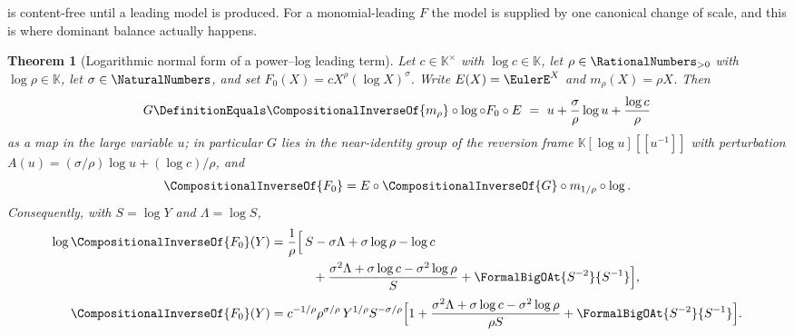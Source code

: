 \documentclass[11pt,oneside]{article}
\theoremstyle{plain}
\newtheorem{theorem}{Theorem}[section]
\theoremstyle{definition}
\theoremstyle{remark}
\newcommand{\K}{\mathbb{K}}
\newcommand{\compose}{\mathbin{\circ}}
\newcommand{\rev}[1]{\CompositionalInverseOf{#1}}
\begin{document}
 is content-free until a leading model is produced.
For a monomial-leading \(F\) the model is supplied by one canonical change of
scale, and this is where dominant balance actually happens.

\begin{theorem}[Logarithmic normal form of a power--log leading term]
\label{plt:thm:lag-log-normal-form}
Let \(c\in\K^\times\) with \(\log c\in\K\), let \(\rho\in\RationalNumbers_{>0}\)
with \(\log\rho\in\K\), let \(\sigma\in\NaturalNumbers\), and set
\(F_0(X)=cX^{\rho}(\log X)^{\sigma}\).  Write \(E(X)=\EulerE^{X}\) and
\(m_\rho(X)=\rho X\).  Then
\begin{equation}
\label{plt:eq:lag-log-conjugate}
  G\DefinitionEquals \rev{m_\rho}\compose\log\compose F_0\compose E
  \ =\ u+\frac{\sigma}{\rho}\log u+\frac{\log c}{\rho}
\end{equation}
as a map in the large variable \(u\); in particular \(G\) lies in the
near-identity group of the reversion frame
\(\K[\log u][[u^{-1}]]\) with perturbation
\(A(u)=(\sigma/\rho)\log u+(\log c)/\rho\), and
\begin{equation}
\label{plt:eq:lag-log-inverse}
  \rev{F_0}=E\compose\rev{G}\compose m_{1/\rho}\compose\log .
\end{equation}
Consequently, with \(S=\log Y\) and \(\Lambda=\log S\),
\begin{align}
  \log\rev{F_0}(Y)
  ={}&\frac1\rho\Bigl[\,S-\sigma\Lambda+\sigma\log\rho-\log c\notag\\
     &\qquad+\frac{\sigma^2\Lambda+\sigma\log c-\sigma^2\log\rho}{S}
      +\FormalBigOAt{S^{-2}}{S^{-1}}\Bigr],
  \label{plt:eq:lag-u-expansion}\\[1mm]
  \rev{F_0}(Y)
  ={}&c^{-1/\rho}\rho^{\sigma/\rho}\,Y^{1/\rho}S^{-\sigma/\rho}
      \Bigl[1+\frac{\sigma^2\Lambda+\sigma\log c-\sigma^2\log\rho}{\rho S}
      +\FormalBigOAt{S^{-2}}{S^{-1}}\Bigr].
  \label{plt:eq:lag-X-expansion}
\end{align}
\end{theorem}
\end{document}
